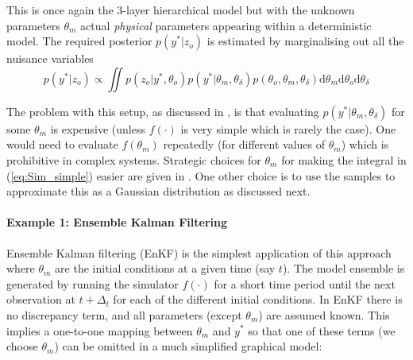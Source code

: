 \documentclass[10pt,a4paper]{article}
\newcommand{\intd} {\textrm{d}}
\begin{document}
\noindent This is once again the 3-layer hierarchical model but with the unknown parameters $\theta_m$ actual \emph{physical} parameters appearing within a deterministic model. The required posterior $p(y^* | z_o)$ is estimated by marginalising out all the nuisance variables
\begin{equation}\label{eq:Sim_simple}
p(y^*|z_o) \propto \iint p(z_o | y^*, \theta_o)p(y^* |\theta_m, \theta_\delta)p(\theta_o, \theta_m, \theta_\delta) \intd \theta_m \intd\theta_o \intd\theta_\delta
\end{equation}

The problem with this setup, as discussed in \citep{Higdon_2004}, is that evaluating $p(y^* | \theta_m, \theta_\delta)$ for some $\theta_m$ is expensive (unless $f(\cdot)$ is very simple which is rarely the case). One would need to evaluate $f(\theta_m)$ repeatedly (for different values of $\theta_m$) which is  prohibitive in complex systems. Strategic choices for $\theta_m$ for making the integral in (\ref{eq:Sim_simple}) easier are given in \cite{Rougier_2007}. One other choice is to use the samples to approximate this as a Gaussian distribution as discussed next.

\paragraph{Example 1: Ensemble Kalman Filtering}
Ensemble Kalman filtering (EnKF) is the simplest application of this approach where $\theta_m$ are the initial conditions at a given time (say $t$). The model ensemble is generated by running the simulator $f(\cdot)$ for a short time period until the next observation at $t+\Delta_t$ for each of the different initial conditions. In EnKF there is no discrepancy term, and all parameters (except $\theta_m$) are assumed known. This implies a one-to-one mapping between $\theta_m$ and $y^*$ so that one of these terms (we choose $\theta_m$) can be omitted in a much simplified graphical model:
\begin{figure}[h!]
\centering
{}
\end{figure}
\end{document}
